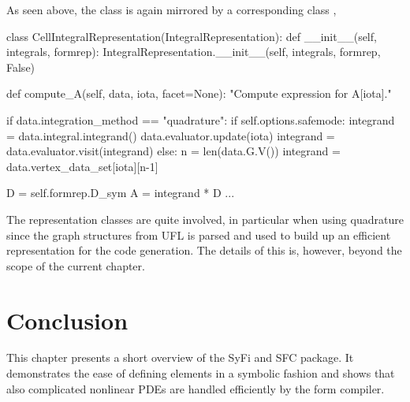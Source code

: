 As seen above, the  class is again mirrored by a corresponding class , 
\begin{code}
class CellIntegralRepresentation(IntegralRepresentation):
    def __init__(self, integrals, formrep):
        IntegralRepresentation.__init__(self, integrals, formrep, False)
    
    def compute_A(self, data, iota, facet=None):
        "Compute expression for A[iota]."
        
        if data.integration_method == "quadrature":
            if self.options.safemode:
                integrand = data.integral.integrand()
                data.evaluator.update(iota)
                integrand = data.evaluator.visit(integrand)
            else:
                n = len(data.G.V())
                integrand = data.vertex_data_set[iota][n-1]
            
            D = self.formrep.D_sym
            A = integrand * D
            ...     
\end{code}
The representation classes are quite involved, in particular when using quadrature since
the graph structures from UFL is parsed and used to build up an efficient representation 
for the code generation. The details of this is, however, beyond the scope of the current chapter.  



\section{Conclusion}

This chapter presents a short overview of the SyFi and SFC package. It demonstrates the ease of defining 
elements in a symbolic fashion and shows that also complicated nonlinear PDEs are handled efficiently
by the form compiler.  




